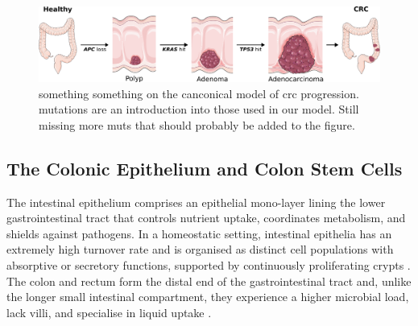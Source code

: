\begin{figure} 
    \centering
    \includegraphics{01intro/figs/1BIO_CRC.png}
    \caption{something something on the canconical model of crc progression. mutations are an introduction into those used in our model. Still missing more muts that should probably be added to the figure.}
    \label{fig:1crc}
\end{figure}
\cite{van_de_wetering_-catenintcf-4_2002}

\subsection{The Colonic Epithelium and Colon Stem Cells}



The intestinal epithelium comprises an epithelial mono-layer lining the lower gastrointestinal tract that controls nutrient uptake, coordinates metabolism, and shields against pathogens. In a homeostatic setting, intestinal epithelia has an extremely high turnover rate and is organised as distinct cell populations with absorptive or secretory functions, supported by continuously proliferating crypts \cite{bonis_intestinal_2021}. The colon and rectum form the distal end of the gastrointestinal tract and, unlike the longer small intestinal compartment, they experience a higher microbial load, lack villi, and specialise in liquid uptake \cite{kiela_physiology_2016}.

